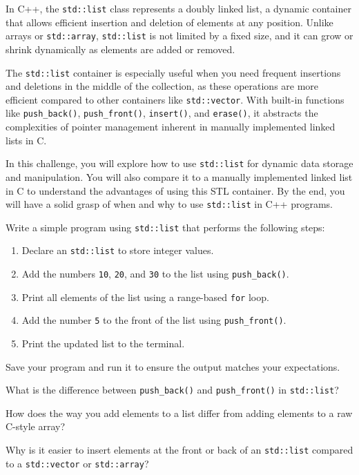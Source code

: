 \begin{challenge}
    \begin{chadescription}
    In C++, the \texttt{std::list} class represents a doubly linked list, a dynamic container that allows efficient insertion and deletion of elements at any position. 
    Unlike arrays or \texttt{std::array}, \texttt{std::list} is not limited by a fixed size, and it can grow or shrink dynamically as elements are added or removed.

    The \texttt{std::list} container is especially useful when you need frequent insertions and deletions in the middle of the collection, as these operations are more efficient compared to other containers like \texttt{std::vector}. 
    With built-in functions like \texttt{push_back()}, \texttt{push_front()}, \texttt{insert()}, and \texttt{erase()}, it abstracts the complexities of pointer management inherent in manually implemented linked lists in C. 

    In this challenge, you will explore how to use \texttt{std::list} for dynamic data storage and manipulation. 
    You will also compare it to a manually implemented linked list in C to understand the advantages of using this STL container. 
    By the end, you will have a solid grasp of when and why to use \texttt{std::list} in C++ programs.
    \end{chadescription}

    \begin{task}
        Write a simple program using \texttt{std::list} that performs the following steps:
        \begin{enumerate}
            \item Declare an \texttt{std::list} to store integer values.
            \item Add the numbers \texttt{10}, \texttt{20}, and \texttt{30} to the list using \texttt{push_back()}.
            \item Print all elements of the list using a range-based \texttt{for} loop.
            \item Add the number \texttt{5} to the front of the list using \texttt{push_front()}.
            \item Print the updated list to the terminal.
        \end{enumerate}

        Save your program and run it to ensure the output matches your expectations.

        \begin{questions}
            \item What is the difference between \texttt{push_back()} and \texttt{push_front()} in \texttt{std::list}?
            \item How does the way you add elements to a list differ from adding elements to a raw C-style array?
            \item Why is it easier to insert elements at the front or back of an \texttt{std::list} compared to a \texttt{std::vector} or \texttt{std::array}?
        \end{questions}
    \end{task}


\end{challenge}
